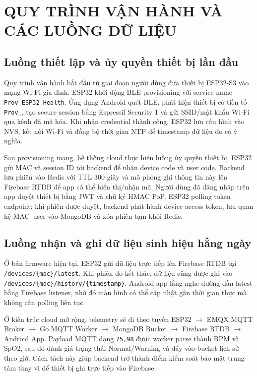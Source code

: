 \documentclass[a4paper,13pt,3p,oneside]{report}
\begin{document}
\chapter{QUY TRÌNH VẬN HÀNH VÀ CÁC LUỒNG DỮ LIỆU}
\section{Luồng thiết lập và ủy quyền thiết bị lần đầu}
Quy trình vận hành bắt đầu từ giai đoạn người dùng đưa thiết bị ESP32-S3 vào mạng Wi-Fi gia đình. ESP32 khởi động BLE provisioning với service name \texttt{Prov\_ESP32\_Health}. Ứng dụng Android quét BLE, phát hiện thiết bị có tiền tố \texttt{Prov\_}, tạo secure session bằng Espressif Security 1 và gửi SSID/mật khẩu Wi-Fi qua kênh đã mã hóa. Khi nhận credential thành công, ESP32 lưu cấu hình vào NVS, kết nối Wi-Fi và đồng bộ thời gian NTP để timestamp dữ liệu đo có ý nghĩa.

Sau provisioning mạng, hệ thống cloud thực hiện luồng ủy quyền thiết bị. ESP32 gửi MAC và session ID tới backend để nhận device code và user code. Backend lưu phiên vào Redis với TTL 300 giây và mô phỏng ghi thông tin này lên Firebase RTDB để app có thể hiển thị/nhận mã. Người dùng đã đăng nhập trên app duyệt thiết bị bằng JWT và chữ ký HMAC PoP. ESP32 polling token endpoint; khi phiên được duyệt, backend phát hành device access token, lưu quan hệ MAC--user vào MongoDB và xóa phiên tạm khỏi Redis.

\section{Luồng nhận và ghi dữ liệu sinh hiệu hằng ngày}
Ở bản firmware hiện tại, ESP32 gửi dữ liệu trực tiếp lên Firebase RTDB tại \texttt{/devices/\{mac\}/latest}. Khi phiên đo kết thúc, dữ liệu cũng được ghi vào \texttt{/devices/\{mac\}/history/\{timestamp\}}. Android app lắng nghe đường dẫn latest bằng Firebase listener, nhờ đó màn hình có thể cập nhật gần thời gian thực mà không cần polling liên tục.

Ở kiến trúc cloud mở rộng, telemetry sẽ đi theo tuyến ESP32 $\rightarrow$ EMQX MQTT Broker $\rightarrow$ Go MQTT Worker $\rightarrow$ MongoDB Bucket $\rightarrow$ Firebase RTDB $\rightarrow$ Android App. Payload MQTT dạng \texttt{75,98} được worker parse thành BPM và SpO2, sau đó đánh giá trạng thái Normal/Warning và đẩy vào bucket lịch sử theo giờ. Cách tách này giúp backend trở thành điểm kiểm soát bảo mật trung tâm thay vì để thiết bị ghi trực tiếp vào Firebase.
\end{document}
